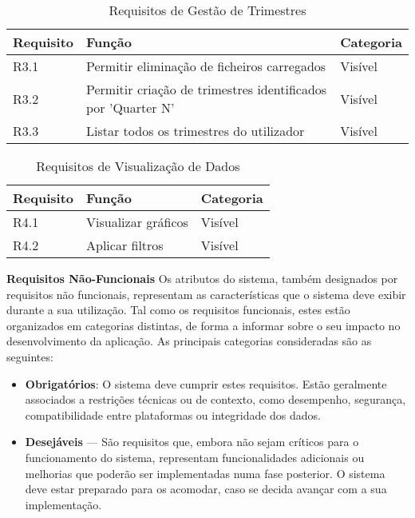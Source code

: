 \begin{table}[H]
\centering
\begin{tabular}{|l|p{7cm}|l|}
\hline
\textbf{Requisito} & \textbf{Função} & \textbf{Categoria} \\
\hline
R3.1 & Permitir eliminação de ficheiros carregados & Visível \\
R3.2 & Permitir criação de trimestres identificados por 'Quarter N' & Visível \\
R3.3 & Listar todos os trimestres do utilizador & Visível \\
\hline
\end{tabular}
\caption{Requisitos de Gestão de Trimestres}
\label{tab:requisitosTrimestres}
\end{table}

\begin{table}[H]
\centering
\begin{tabular}{|l|p{7cm}|l|}
\hline
\textbf{Requisito} & \textbf{Função} & \textbf{Categoria} \\
\hline
R4.1 & Visualizar gráficos & Visível \\
R4.2 & Aplicar filtros & Visível \\
\hline
\end{tabular}
\caption{Requisitos de Visualização de Dados}
\label{tab:requisitosVisualizacao}
\end{table}

\textbf{Requisitos Não-Funcionais}
Os atributos do sistema, também designados por requisitos não funcionais, representam as características que o sistema deve exibir durante a sua utilização. Tal como os requisitos funcionais, estes estão organizados em categorias distintas, de forma a informar sobre o seu impacto no desenvolvimento da aplicação. As principais categorias consideradas são as seguintes:

\begin{itemize}
\item \textbf{Obrigatórios}: O sistema deve cumprir estes requisitos. Estão geralmente associados a restrições técnicas ou de contexto, como desempenho, segurança, compatibilidade entre plataformas ou integridade dos dados.

\item \textbf{Desejáveis} — São requisitos que, embora não sejam críticos para o funcionamento do sistema, representam funcionalidades adicionais ou melhorias que poderão ser implementadas numa fase posterior. O sistema deve estar preparado para os acomodar, caso se decida avançar com a sua implementação.
\end{itemize}

